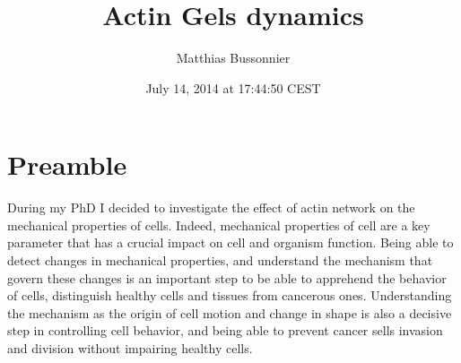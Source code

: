 \documentclass[A4paperpaper,11pt,english]{sphinxmanual}
\title{Actin Gels dynamics}
\date{July 14, 2014 at 17:44:50 CEST}
\author{Matthias Bussonnier}
\renewcommand{\maketitle}{}
\begin{document}
\maketitle

\tableofcontents
\cleardoublepage
\pagestyle{normal}
\setlength{\headheight}{14pt}
 
\label{index-latex::doc}



\chapter{Preamble}
\label{parts/part1:preamble}\label{parts/part1::doc}\label{parts/part1:contents}
During my PhD I decided to investigate the effect of actin network on the
mechanical properties of cells. Indeed, mechanical properties of cell are a key
parameter that has a crucial impact on cell and organism function. Being able
to detect changes in mechanical properties, and understand the mechanism that
govern these changes  is an important step to be able to apprehend the behavior
of cells, distinguish healthy cells and tissues from cancerous ones.
Understanding the mechanism as the origin of cell motion and change in shape is
also a decisive step in controlling cell behavior, and being able to prevent
cancer sells invasion and division without impairing healthy cells.
\end{document}
